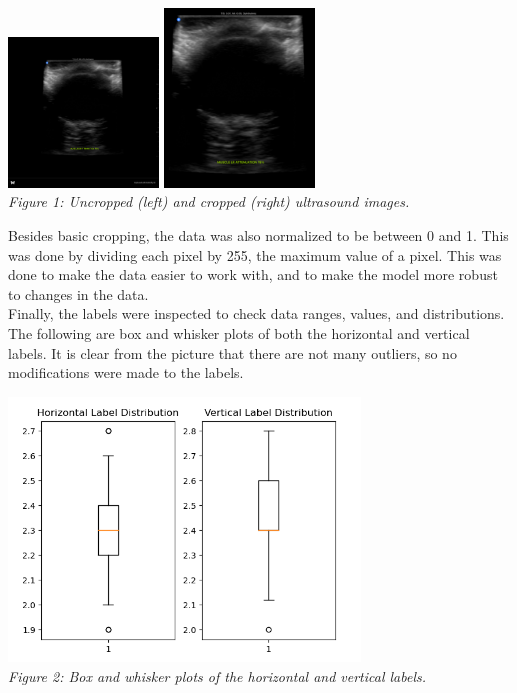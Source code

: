 \documentclass{article}[12pt]
\begin{document}
\begin{center}
    \includegraphics[width=0.3\textwidth]{images/uncropped.png}
    \includegraphics[width=0.3\textwidth]{images/cropped.png}\\
    \textit{Figure 1: Uncropped (left) and cropped (right) ultrasound images.}
\end{center}

\indent
Besides basic cropping, the data was also normalized to be between 0 and 1. This was done by dividing each pixel by 255, the maximum value of a pixel. This was done to make the data easier to work with, and to make the model more robust to changes in the data. \\

\indent
Finally, the labels were inspected to check data ranges, values, and distributions. The following are box and whisker plots of both the horizontal and vertical labels. It is clear from the picture that there are not many outliers, so no modifications were made to the labels.\\

\begin{center}
    \includegraphics[width=0.7\textwidth]{images/label_distribution.png}\\
    \textit{Figure 2: Box and whisker plots of the horizontal and vertical labels.}
\end{center}
\end{document}

